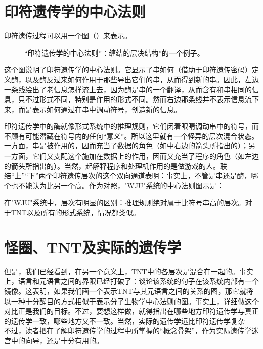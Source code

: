 \section{印符遗传学的中心法则}

印符遗传过程可以用一个图（）来表示。

\begin{figure}
\caption[印符遗传学的中心法则。]
  {“印符遗传学的中心法则”：缠结的层决结构”的一个例子。}
\end{figure}

这个图说明了印符遗传学的中心法则。它显示了串如何（借助于印符遗传密码）定义酶，以及酶反过来如何作用于那些导出它们的串，从而得到新的串。因此，左边一条线绘出了老信息怎样流上去，因为酶是串的一个翻译，从而含有和串相同的信息，只不过形式不同，特别是作用的形式不同。然而右边那条线并不表示信息流下来，而是表示如何通过在串中调动符号，创造新的信息。

印符遗传学中的酶就像形式系统中的推理规则，它们闭着眼睛调动串中的符号，而不顾有可能潜藏在符号内的任何“意义”。所以这里就有一个怪异的层次混合状态。一方面，串是被作用的，因而充当了数据的角色（如中右边的箭头所指出的）；另一方面，它们又支配这个施加在数据上的作用，因而又充当了程序的角色（如左边的箭头所指出的）。当然，起解释程序和处理机作用的是做游戏的人。联结“上”“下”两个印符遗传层次的这个双向通道表明：事实上，不管是串还是酶，哪个也不能认为比另一个高。作为对照，"WJU"系统的中心法则图示是：
\begin{center}
\end{center}\nointerlineskip
在"WJU"系统中，层次有明显的区别：推理规则绝对属于比符号串高的层次。对于TNT以及所有的形式系统，情况都类似。

\section{怪圈、TNT及实际的遗传学}

但是，我们已经看到，在另一个意义上，TNT中的各层次是混合在一起的。事实上，语言和元语言之间的界限已经打破了：谈论该系统的句子在该系统内部有一个镜像。这表明，如果我们画一个表示TNT与其元语言之间的关系的图，那它就将以一种十分醒目的方式相似于表示分子生物学中心法则的图。事实上，详细做这个对比正是我们的目标。不过，要想这样做，就得指出在哪些地方印符遗传学与真正的遗传学一致，哪些地方又不一致。当然，实际的遗传学远比印符遗传学复杂——不过，读者把在了解印符遗传学的过程中所掌握的“概念骨架”，作为实际遗传学迷宫中的向导，还是十分有用的。


